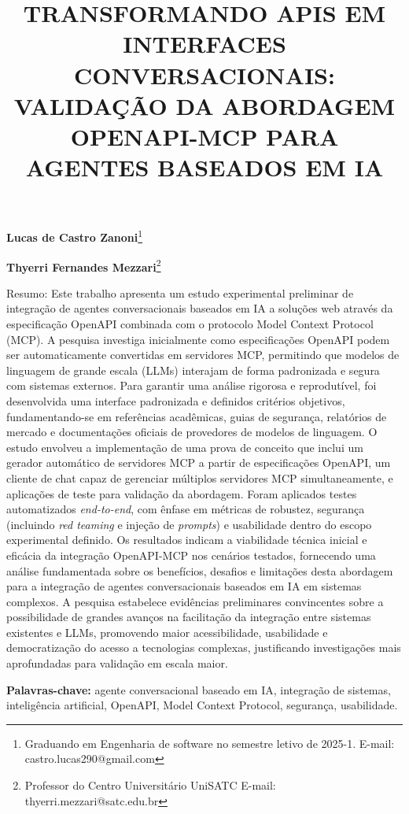 \documentclass[
]{article}
\title{\textbf{TRANSFORMANDO APIS EM INTERFACES CONVERSACIONAIS:
VALIDAÇÃO DA ABORDAGEM OPENAPI-MCP PARA AGENTES BASEADOS EM IA}}
\author{}
\date{}
\begin{document}
\maketitle

\textbf{Lucas de Castro Zanoni}\footnote{Graduando em Engenharia de
  software no semestre letivo de 2025-1. E-mail:
  castro.lucas290@gmail.com}

\textbf{Thyerri Fernandes Mezzari}\footnote{Professor do Centro
  Universitário UniSATC E-mail: thyerri.mezzari@satc.edu.br}

Resumo: Este trabalho apresenta um estudo experimental preliminar de
integração de agentes conversacionais baseados em IA a soluções web
através da especificação OpenAPI combinada com o protocolo Model Context
Protocol (MCP). A pesquisa investiga inicialmente como especificações
OpenAPI podem ser automaticamente convertidas em servidores MCP,
permitindo que modelos de linguagem de grande escala (LLMs) interajam de
forma padronizada e segura com sistemas externos. Para garantir uma
análise rigorosa e reprodutível, foi desenvolvida uma interface
padronizada e definidos critérios objetivos, fundamentando-se em
referências acadêmicas, guias de segurança, relatórios de mercado e
documentações oficiais de provedores de modelos de linguagem. O estudo
envolveu a implementação de uma prova de conceito que inclui um gerador
automático de servidores MCP a partir de especificações OpenAPI, um
cliente de chat capaz de gerenciar múltiplos servidores MCP
simultaneamente, e aplicações de teste para validação da abordagem.
Foram aplicados testes automatizados \emph{end-to-end}, com ênfase em
métricas de robustez, segurança (incluindo \emph{red teaming} e injeção
de \emph{prompts}) e usabilidade dentro do escopo experimental definido.
Os resultados indicam a viabilidade técnica inicial e eficácia da
integração OpenAPI-MCP nos cenários testados, fornecendo uma análise
fundamentada sobre os benefícios, desafios e limitações desta abordagem
para a integração de agentes conversacionais baseados em IA em sistemas
complexos. A pesquisa estabelece evidências preliminares convincentes
sobre a possibilidade de grandes avanços na facilitação da integração
entre sistemas existentes e LLMs, promovendo maior acessibilidade,
usabilidade e democratização do acesso a tecnologias complexas,
justificando investigações mais aprofundadas para validação em escala
maior.

\textbf{Palavras-chave:} agente conversacional baseado em IA, integração
de sistemas, inteligência artificial, OpenAPI, Model Context Protocol,
segurança, usabilidade.
\end{document}
